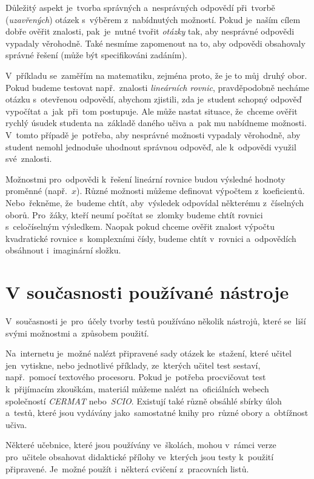 \documentclass[11pt,a4paper]{report}
\begin{document}
            Důležitý aspekt je~tvorba správných a~nesprávných odpovědí při~tvorbě (\emph{uzavřených}) otázek s~výběrem z~nabídnutých možností. Pokud je~naším cílem dobře ověřit znalosti, pak~je~nutné tvořit \emph{otázky} tak, aby nesprávné odpovědi vypadaly věrohodně. Také nesmíme zapomenout na to, aby odpovědi obsahovaly správné řešení (může být specifikováni zadáním).

            V~příkladu se~zaměřím na matematiku, zejména proto, že je to můj~druhý obor. Pokud budeme testovat např.~znalosti \emph{lineárních rovnic}, pravděpodobně necháme otázku s~otevřenou odpovědí, abychom zjistili, zda je~student schopný odpověď vypočítat a~jak~při~tom postupuje. Ale může nastat situace, že~chceme ověřit rychlý úsudek studenta na~základě daného učiva a~pak mu nabídneme možnosti. V~tomto případě je~potřeba, aby nesprávné možnosti vypadaly věrohodně, aby student nemohl jednoduše uhodnout správnou odpověď, ale k~odpovědi využil své~znalosti.

            Možnostmi pro~odpovědi k~řešení lineární rovnice budou výsledné hodnoty proměnné (např.~$x$). Různé možnosti můžeme definovat výpočtem z~koeficientů. Nebo~řekněme, že~budeme chtít, aby~výsledek odpovídal některému z~číselných oborů. Pro~žáky, kteří neumí počítat se~zlomky budeme chtít rovnici s~celočíselným výsledkem. Naopak pokud chceme ověřit znalost výpočtu kvadratické rovnice s~komplexními čísly, budeme chtít v~rovnici a~odpovědích obsáhnout i~imaginární složku. \cite{zhouf:tvorbamatproblemu}

        \section{V současnosti používané nástroje}
            V~současnosti je~pro~účely tvorby testů používáno několik nástrojů, které se~liší svými možnostmi a~způsobem použití.
            
            Na~internetu je~možné nalézt připravené sady otázek ke~stažení, které učitel jen~vytiskne, nebo jednotlivé příklady, ze~kterých učitel test sestaví, např.~pomocí textového procesoru. Pokud je~potřeba procvičovat test k~přijímacím zkouškám, materiál můžeme nalézt na~oficiálních webech společností \emph{CERMAT} nebo~\emph{SCIO}. Existují také různě obsáhlé sbírky úloh a~testů, které jsou vydávány jako~samostatné knihy pro~různé obory a~obtížnost učiva.

            Některé učebnice, které jsou používány ve~školách, mohou v~rámci verze pro~učitele obsahovat didaktické přílohy ve~kterých jsou testy k~použití připravené. Je~možné použít i~některá cvičení z~pracovních listů.
\end{document}
